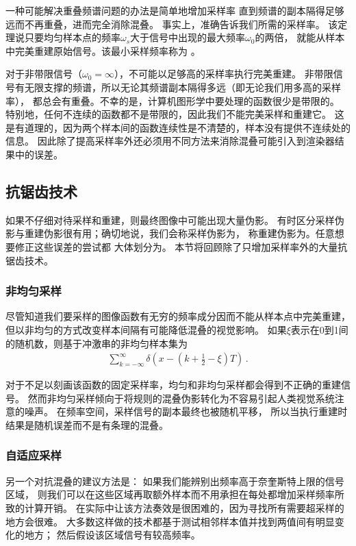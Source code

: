 一种可能解决重叠频谱问题的办法是简单地增加采样率
直到频谱的副本隔得足够远而不再重叠，进而完全消除混叠。
事实上，准确告诉我们所需的采样率。
该定理说只要均匀样本点的频率$\omega_s$大于信号中出现的最大频率$\omega_0$的两倍，
就能从样本中完美重建原始信号。该最小采样频率称为
。

对于非带限信号（$\omega_0=\infty$），不可能以足够高的采样率执行完美重建。
非带限信号有无限支撑的频谱，所以无论其频谱副本隔得多远（即无论我们用多高的采样率），
都总会有重叠。不幸的是，计算机图形学中要处理的函数很少是带限的。
特别地，任何不连续的函数都不是带限的，因此我们不能完美采样和重建它。
这是有道理的，因为两个样本间的函数连续性是不清楚的，样本没有提供不连续处的信息。
因此除了提高采样率外还必须用不同方法来消除混叠可能引入到渲染器结果中的误差。

\subsection{抗锯齿技术}\label{sub:抗锯齿技术}
如果不仔细对待采样和重建，则最终图像中可能出现大量伪影。
有时区分采样伪影与重建伪影很有用；确切地说，我们会称采样伪影为，
称重建伪影为。任意想要修正这些误差的尝试都
大体划分为。
本节将回顾除了只增加采样率外的大量抗锯齿技术。

\subsubsection*{非均匀采样}
尽管知道我们要采样的图像函数有无穷的频率成分因而不能从样本点中完美重建，
但以非均匀的方式改变样本间隔有可能降低混叠的视觉影响。
如果$\xi$表示在0到1间的随机数，则基于冲激串的非均匀样本集为
\begin{align*}
    \sum\limits_{k=-\infty}^{\infty}\delta\left(x-(k+\frac{1}{2}-\xi)T\right)\, .
\end{align*}

对于不足以刻画该函数的固定采样率，均匀和非均匀采样都会得到不正确的重建信号。
然而非均匀采样倾向于将规则的混叠伪影转化为不容易引起人类视觉系统注意的噪声。
在频率空间，采样信号的副本最终也被随机平移，
所以当执行重建时结果是随机误差而不是有条理的混叠。

\subsubsection*{自适应采样}
另一个对抗混叠的建议方法是：
如果我们能辨别出频率高于奈奎斯特上限的信号区域，
则我们可以在这些区域再取额外样本而不用承担在每处都增加采样频率所致的计算开销。
在实际中让该方法奏效是很困难的，因为寻找所有需要超采样的地方会很难。
大多数这样做的技术都基于测试相邻样本值并找到两值间有明显变化的地方；
然后假设该区域信号有较高频率。

